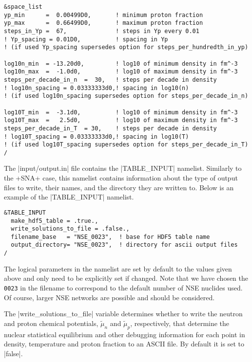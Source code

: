 \documentclass[letterpaper,11pt]{refart}
\begin{document}
{\color{cyan}
\begin{verbatim}
&space_list
yp_min      =  0.00499D0,       ! minimum proton fraction
yp_max      =  0.66499D0,       ! maximum proton fraction
steps_in_Yp =  67,              ! steps in Yp every 0.01
! Yp_spacing = 0.01D0,          ! spacing in Yp 
! (if used Yp_spacing supersedes option for steps_per_hundredth_in_yp)

log10n_min  = -13.20d0,         ! log10 of minimum density in fm^-3
log10n_max  =  -1.0d0,          ! log10 of maximum density in fm^-3
steps_per_decade_in_n  =  30,   ! steps per decade in density
! log10n_spacing = 0.03333333d0,! spacing in log10(n) 
! (if used log10n_spacing supersedes option for steps_per_decade_in_n)

log10T_min  =  -3.1d0,          ! log10 of minimum density in fm^-3
log10T_max  =   2.5d0,          ! log10 of maximum density in fm^-3
steps_per_decade_in_T  = 30,    ! steps per decade in density
! log10T_spacing = 0.03333333d0,! spacing in log10(T) 
! (if used log10T_spacing supersedes option for steps_per_decade_in_T)
/
\end{verbatim}}

The \verbfile|input/output.in| file contains the \verbnml|TABLE_INPUT|
namelist. Similarly to the \verbexec+SNA+ case, this namelist contains
information about the type of output files to write, their names, and
the directory they are written to. Below is an example of the
\verbnml|TABLE_INPUT| namelist.

{\color{cyan}
\begin{verbatim}
&TABLE_INPUT
  make_hdf5_table = .true.,
  write_solutions_to_file = .false., 
  filename_base   = "NSE_0023",  ! base for HDF5 table name
  output_directory= "NSE_0023",  ! directory for ascii output files
/
\end{verbatim}}
The logical parameters in the namelist are set by default to the
values given above and only need to be explicitly set if changed.
Note that we have chosen the \texttt{0023} in the filename to
correspond to the default number of NSE nuclides used. Of course,
larger NSE networks are possible and should be considered.

The \verbprm|write_solutions_to_file| variable determines whether 
to write the neutron and proton chemical potentials, $\tilde\mu_n$ 
and $\tilde\mu_p$, respectively, that determine the nuclear 
statistical equilibrium and other debugging information for each 
point in density, temperature and proton fraction to an ASCII file. 
By default it is set to \verbprm|false|. 
\end{document}
